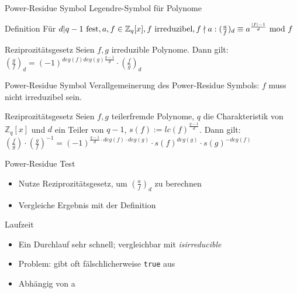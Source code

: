 \documentclass[german,10pt,xcolor=colortbl,compress]{beamer}%
\newcommand{\ZZ}{\mathbb{Z}}
\begin{document}
	\begin{frame}{Power-Residue Symbol}
		Legendre-Symbol für Polynome 
		\begin{block}{Definition}
			Für $d|q-1 \text{ fest},  a,f \in \ZZ_q[x], f \text{ irreduzibel}, f \nmid a: 
			\newline 	
			(\frac{a}{f})_d  \equiv a^{\frac{|f|-1}{d}} \text{ mod } f$
		\end{block}
	
		\begin{block}{Reziprozitätsgesetz}
			Seien $f,g$ irreduzible Polynome. Dann gilt:
			$(\frac{g}{f})_d=(-1)^{deg(f)deg(g)\frac{q-1}{d}} \cdot (\frac{f}{g})_d $ 				
		\end{block}
	\end{frame}

	
	\begin{frame}{Power-Residue Symbol}
		Verallgemeinerung des Power-Residue Symbols: $f$ muss nicht irreduzibel sein.
		
		\begin{block}{Reziprozitätsgesetz}
			Seien $f,g$ teilerfremde Polynome, $q$ die Charakteristik von $\ZZ_q[x]$ und $d$ ein Teiler von $q-1$,
			$s(f):=lc(f)^{\frac{q-1}{d}}$.
			Dann gilt:
			$\left(\frac{f}{g}\right) \cdot \left(\frac{g}{f}\right)^{-1} = (-1)^{\frac{q-1}{d} \cdot deg(f)\cdot deg(g)}\cdot s(f)^{deg(g)} \cdot s(g)^{-deg(f)} $
							
		\end{block}
	\end{frame}

	
	\begin{frame}{Power-Residue Test}
		\begin{itemize}
		\item Nutze Reziprozitätsgesetz, um $(\frac{a}{f})_d $ zu berechnen
		\item Vergleiche Ergebnis mit der Definition
		\end{itemize}
	\end{frame}

	
	\begin{frame}{Laufzeit}
		\begin{itemize}
			\item Ein Durchlauf sehr schnell; vergleichbar mit \textit{isirreducible}
			\item Problem: gibt oft fälschlicherweise \texttt{true} aus
			\item Abhängig von a
		\end{itemize}
	\end{frame}
\end{document}
